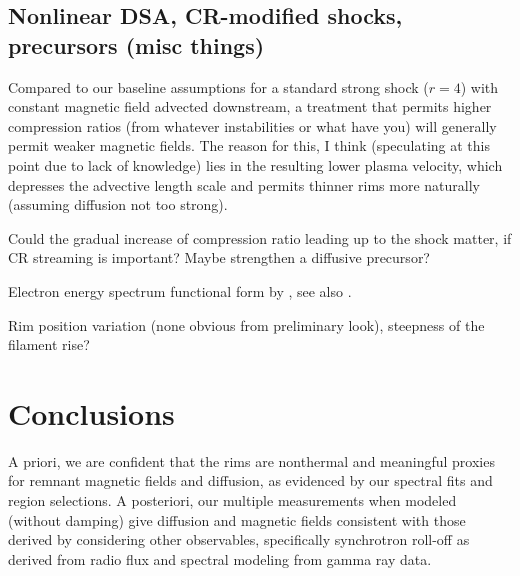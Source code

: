 \documentclass[iop, apj, numberedappendix, twocolappendix]{emulateapj}
\newcommand*{\mt}{\mathrm}
\newcommand*{\unit}[1]{\;\mt{#1}}  %
\begin{document}
\subsection{Nonlinear DSA, CR-modified shocks, precursors (misc things)}

Compared to our baseline assumptions for a standard strong shock ($r=4$) with
constant magnetic field advected downstream, a treatment that permits higher
compression ratios (from whatever instabilities or what have you) will
generally permit weaker magnetic fields.  The reason for this, I think
(speculating at this point due to lack of knowledge) lies in the resulting
lower plasma velocity, which depresses the advective length scale and permits
thinner rims more naturally (assuming diffusion not too strong).

Could the gradual increase of compression ratio leading up to the shock matter,
if CR streaming is important?  Maybe strengthen a diffusive precursor?

Electron energy spectrum functional form by \citet{zirakashvili2007}, see also
\citet{morlino2009}.

Rim position variation (none obvious from preliminary look), steepness of the
filament rise?



\section{Conclusions}

A priori, we are confident that the rims are nonthermal and meaningful proxies
for remnant magnetic fields and diffusion, as evidenced by our spectral fits
and region selections.
A posteriori, our multiple measurements when modeled (without damping) give
diffusion and magnetic fields consistent with those derived by considering
other observables, specifically synchrotron roll-off as derived from radio flux
and spectral modeling from gamma ray data.
\end{document}

